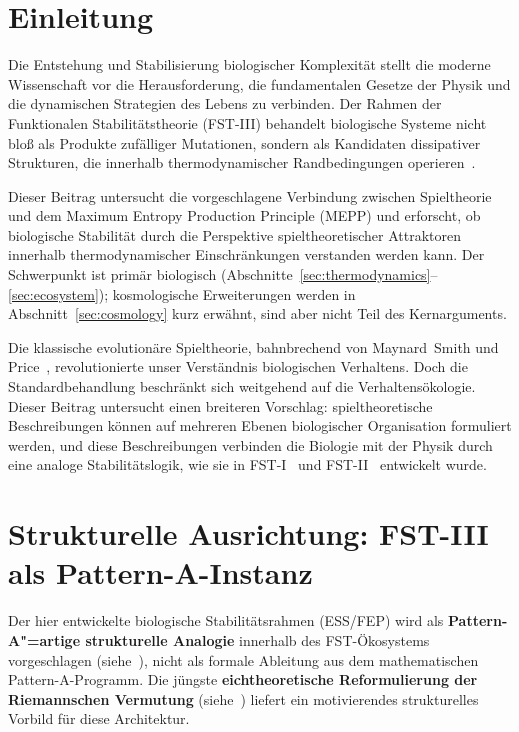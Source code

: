 \documentclass[12pt,a4paper]{article}
\theoremstyle{remark}
\begin{document}
\section{Einleitung}
\label{sec:introduction}

Die Entstehung und Stabilisierung biologischer Komplexität stellt die moderne Wissenschaft vor die Herausforderung, die fundamentalen Gesetze der Physik und die dynamischen Strategien des Lebens zu verbinden. Der Rahmen der Funktionalen Stabilitätstheorie (FST-III) behandelt biologische Systeme nicht bloß als Produkte zufälliger Mutationen, sondern als Kandidaten dissipativer Strukturen, die innerhalb thermodynamischer Randbedingungen operieren~\citep{EcosystemMEPP}.

Dieser Beitrag untersucht die vorgeschlagene Verbindung zwischen Spieltheorie und dem Maximum Entropy Production Principle (MEPP) und erforscht, ob biologische Stabilität durch die Perspektive spieltheoretischer Attraktoren innerhalb thermodynamischer Einschränkungen verstanden werden kann. Der Schwerpunkt ist primär biologisch (Abschnitte~\ref{sec:thermodynamics}--\ref{sec:ecosystem}); kosmologische Erweiterungen werden in Abschnitt~\ref{sec:cosmology} kurz erwähnt, sind aber nicht Teil des Kernarguments.

Die klassische evolutionäre Spieltheorie, bahnbrechend von Maynard~Smith und Price~\citep{MaynardSmithPrice1973,MaynardSmith1982}, revolutionierte unser Verständnis biologischen Verhaltens. Doch die Standardbehandlung beschränkt sich weitgehend auf die Verhaltensökologie. Dieser Beitrag untersucht einen breiteren Vorschlag: spieltheoretische Beschreibungen können auf mehreren Ebenen biologischer Organisation formuliert werden, und diese Beschreibungen verbinden die Biologie mit der Physik durch eine analoge Stabilitätslogik, wie sie in FST-I~\citep{FSTI} und FST-II~\citep{FSTII} entwickelt wurde.

\section{Strukturelle Ausrichtung: FST-III als Pattern-A-Instanz}
\label{sec:structural-alignment}

Der hier entwickelte biologische Stabilitätsrahmen (ESS/FEP) wird als \textbf{Pattern-A"=artige strukturelle Analogie} innerhalb des FST-Ökosystems vorgeschlagen (siehe~\cite{FST-Unified2026}), nicht als formale Ableitung aus dem mathematischen Pattern-A-Programm. Die jüngste \textbf{eichtheoretische Reformulierung der Riemannschen Vermutung} (siehe~\cite{GeigerRH2026c}) liefert ein motivierendes strukturelles Vorbild für diese Architektur.
\end{document}
